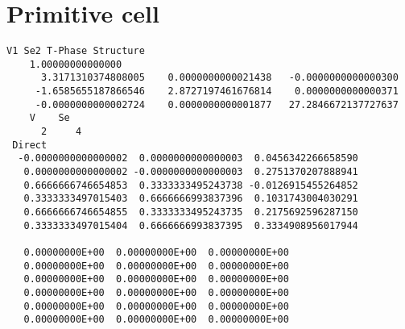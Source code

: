 \section{Primitive cell}


\begin{lstlisting}[style=kaolstplain, linewidth=1.5\textwidth]
V1 Se2 T-Phase Structure
    1.00000000000000
      3.3171310374808005    0.0000000000021438   -0.0000000000000300
     -1.6585655187866546    2.8727197461676814    0.0000000000000371
     -0.0000000000002724    0.0000000000001877   27.2846672137727637
    V    Se
      2     4
 Direct
  -0.0000000000000002  0.0000000000000003  0.0456342266658590       
   0.0000000000000002 -0.0000000000000003  0.2751370207888941       
   0.6666666746654853  0.3333333495243738 -0.0126915455264852       
   0.3333333497015403  0.6666666993837396  0.1031743004030291       
   0.6666666746654855  0.3333333495243735  0.2175692596287150       
   0.3333333497015404  0.6666666993837395  0.3334908956017944       
 
   0.00000000E+00  0.00000000E+00  0.00000000E+00
   0.00000000E+00  0.00000000E+00  0.00000000E+00
   0.00000000E+00  0.00000000E+00  0.00000000E+00
   0.00000000E+00  0.00000000E+00  0.00000000E+00
   0.00000000E+00  0.00000000E+00  0.00000000E+00
   0.00000000E+00  0.00000000E+00  0.00000000E+00
\end{lstlisting}
